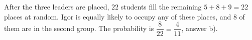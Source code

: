 After the three leaders are placed, $22$ students fill the remaining $5+8+9=22$ places at random. Igor is equally likely to occupy any of these places, and $8$ of them are in the second group. The probability is $\dfrac8{22}=\boxed{\dfrac4{11}}$, answer b).
